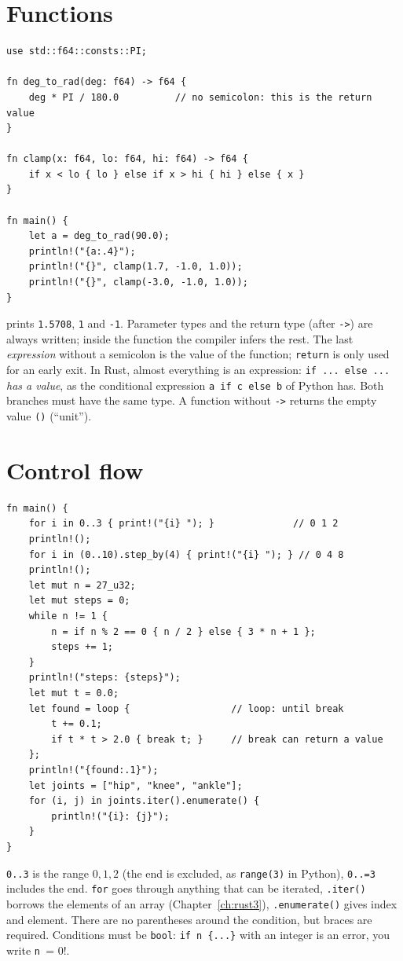 \section*{Functions}
\begin{verbatim}
use std::f64::consts::PI;

fn deg_to_rad(deg: f64) -> f64 {
    deg * PI / 180.0          // no semicolon: this is the return value
}

fn clamp(x: f64, lo: f64, hi: f64) -> f64 {
    if x < lo { lo } else if x > hi { hi } else { x }
}

fn main() {
    let a = deg_to_rad(90.0);
    println!("{a:.4}");
    println!("{}", clamp(1.7, -1.0, 1.0));
    println!("{}", clamp(-3.0, -1.0, 1.0));
}
\end{verbatim}
prints \verb!1.5708!, \verb!1! and \verb!-1!. Parameter types and the return type (after \verb!->!) are always written; inside the function the compiler infers the rest. The last \emph{expression} without a semicolon is the value of the function; \verb!return! is only used for an early exit. In Rust, almost everything is an expression: \verb!if ... else ...! \emph{has a value}, as the conditional expression \verb!a if c else b! of Python has. Both branches must have the same type. A function without \verb!->! returns the empty value \verb!()! (``unit'').

\section*{Control flow}
\begin{verbatim}
fn main() {
    for i in 0..3 { print!("{i} "); }              // 0 1 2
    println!();
    for i in (0..10).step_by(4) { print!("{i} "); } // 0 4 8
    println!();
    let mut n = 27_u32;
    let mut steps = 0;
    while n != 1 {
        n = if n % 2 == 0 { n / 2 } else { 3 * n + 1 };
        steps += 1;
    }
    println!("steps: {steps}");
    let mut t = 0.0;
    let found = loop {                  // loop: until break
        t += 0.1;
        if t * t > 2.0 { break t; }     // break can return a value
    };
    println!("{found:.1}");
    let joints = ["hip", "knee", "ankle"];
    for (i, j) in joints.iter().enumerate() {
        println!("{i}: {j}");
    }
}
\end{verbatim}
\verb!0..3! is the range $0,1,2$ (the end is excluded, as \verb!range(3)! in Python), \verb!0..=3! includes the end. \verb!for! goes through anything that can be iterated, \verb!.iter()! borrows the elements of an array (Chapter~\ref{ch:rust3}), \verb!.enumerate()! gives index and element. There are no parentheses around the condition, but braces are required. Conditions must be \verb!bool!: \verb!if n {...}! with an integer is an error, you write \verb!n != 0!.

